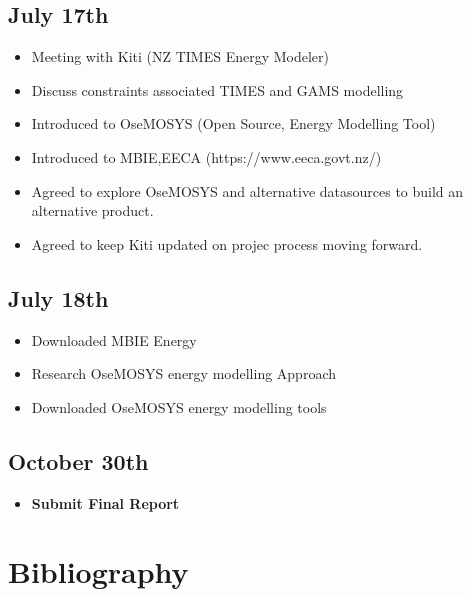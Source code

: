 \documentclass[12pt]{article}
\begin{document}
\subsection{July 17th}
\begin{itemize}
	\item Meeting with Kiti (NZ TIMES Energy Modeler)
	\item Discuss constraints associated TIMES and GAMS modelling
	\item Introduced to OseMOSYS (Open Source, Energy Modelling Tool)
	\item Introduced to MBIE,EECA (https://www.eeca.govt.nz/)
	\item Agreed to explore OseMOSYS and alternative datasources to build an alternative product.
	\item Agreed to keep Kiti updated on projec process moving forward.
\end{itemize}
\subsection{July 18th}
\begin{itemize}
	\item Downloaded MBIE Energy 
	\item Research OseMOSYS energy modelling Approach
	\item Downloaded OseMOSYS energy modelling tools
\end{itemize}
\subsection{October 30th}
\begin{itemize}
	\item \textbf{Submit Final Report}
\end{itemize}
\section{Bibliography}
\printbibliography
\end{document}
